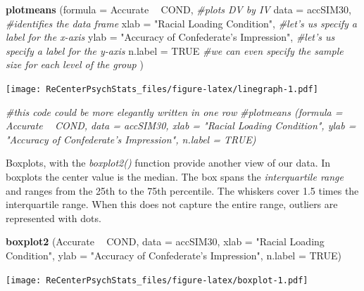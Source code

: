 \documentclass[
  english,
]{book}
\newenvironment{Shaded}{\begin{snugshade}}{\end{snugshade}}
\newcommand{\CommentTok}[1]{\textcolor[rgb]{0.56,0.35,0.01}{\textit{#1}}}
\newcommand{\DataTypeTok}[1]{\textcolor[rgb]{0.13,0.29,0.53}{#1}}
\newcommand{\KeywordTok}[1]{\textcolor[rgb]{0.13,0.29,0.53}{\textbf{#1}}}
\newcommand{\NormalTok}[1]{#1}
\newcommand{\OperatorTok}[1]{\textcolor[rgb]{0.81,0.36,0.00}{\textbf{#1}}}
\newcommand{\OtherTok}[1]{\textcolor[rgb]{0.56,0.35,0.01}{#1}}
\newcommand{\StringTok}[1]{\textcolor[rgb]{0.31,0.60,0.02}{#1}}
\begin{document}
\begin{Shaded}
\begin{Highlighting}[]
\KeywordTok{plotmeans}\NormalTok{ (}\DataTypeTok{formula =}\NormalTok{ Accurate }\OperatorTok{~}\StringTok{ }\NormalTok{COND, }\CommentTok{#plots DV by IV}
           \DataTypeTok{data =}\NormalTok{ accSIM30, }\CommentTok{#identifies the data frame}
           \DataTypeTok{xlab =} \StringTok{"Racial Loading Condition"}\NormalTok{, }\CommentTok{#let's us specify a label for the x-axis}
           \DataTypeTok{ylab =} \StringTok{"Accuracy of Confederate's Impression"}\NormalTok{, }\CommentTok{#let's us specify a label for the y-axis}
           \DataTypeTok{n.label =} \OtherTok{TRUE}  \CommentTok{#we can even specify the sample size for each level of the group}
\NormalTok{           )}
\end{Highlighting}
\end{Shaded}

\texttt{[image: ReCenterPsychStats\_files/figure-latex/linegraph-1.pdf]}

\begin{Shaded}
\begin{Highlighting}[]
\CommentTok{#this code could be more elegantly written in one row}
\CommentTok{#plotmeans (formula = Accurate ~ COND, data = accSIM30, xlab = "Racial Loading Condition", ylab = "Accuracy of Confederate's Impression", n.label = TRUE)}
\end{Highlighting}
\end{Shaded}

Boxplots, with the \emph{boxplot2()} function provide another view of our data. In boxplots the center value is the median. The box spans the \emph{interquartile range} and ranges from the 25th to the 75th percentile. The whiskers cover 1.5 times the interquartile range. When this does not capture the entire range, outliers are represented with dots.

\begin{Shaded}
\begin{Highlighting}[]
\KeywordTok{boxplot2}\NormalTok{ (Accurate }\OperatorTok{~}\StringTok{ }\NormalTok{COND, }\DataTypeTok{data =}\NormalTok{ accSIM30, }\DataTypeTok{xlab =} \StringTok{"Racial Loading Condition"}\NormalTok{, }\DataTypeTok{ylab =} \StringTok{"Accuracy of Confederate's Impression"}\NormalTok{, }\DataTypeTok{n.label =} \OtherTok{TRUE}\NormalTok{)}
\end{Highlighting}
\end{Shaded}

\texttt{[image: ReCenterPsychStats\_files/figure-latex/boxplot-1.pdf]}
\end{document}
